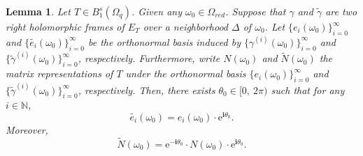 \documentclass[pdflatex,sn-mathphys-num]{sn-jnl}%
\theoremstyle{thmstyleone}%
\theoremstyle{thmstyletwo}%
\theoremstyle{thmstylethree}%
\newtheorem{lemma}{Lemma}%
\newtheorem{lemma}[theorem]{Lemma}
\theoremstyle{definition}
\theoremstyle{remark}
\begin{document}
\begin{lemma}\label{Canonical}
Let $T\in B_1^{s}(\Omega_q)$. Given any $\omega_0\in\Omega_{red}$. Suppose that $\gamma$ and $\widetilde{\gamma}$ are two right holomorphic  frames  of $E_T$ over a neighborhood $\Delta$ of $\omega_0$. Let $\{e_i(\omega_0)\}_{i=0}^{\infty}$ and $\{\widetilde{e_i}(\omega_0)\}_{i=0}^{\infty}$ be the orthonormal basis induced by $\{\gamma^{(i)}(\omega_0)\}_{i=0}^{\infty}$ and $\{\widetilde{\gamma}^{(i)}(\omega_0)\}_{i=0}^{\infty}$, respectively. Furthermore, write $N(\omega_0)$ and  $\widetilde{N}(\omega_0)$ the matrix representations of $T$ under the orthonormal basis $\{e_i(\omega_0)\}_{i=0}^{\infty}$ and $\{\widetilde{\gamma}^{(i)}(\omega_0)\}_{i=0}^{\infty}$, respectively. Then, there exists $\theta_0\in[0,\ 2\pi)$ such that for any $i\in\mathbb{N}$,
\[
\widetilde{e_i}(\omega_0)=e_i(\omega_0)\cdot\mathrm{e}^{\boldsymbol{i}\theta_0}.
\]
Moreover,
\[
\widetilde{N}(\omega_0)=\mathrm{e}^{-\boldsymbol{i}\theta_0}\cdot N(\omega_0) \cdot\mathrm{e}^{\boldsymbol{i}\theta_0}.
\]
\end{lemma}
\end{document}
